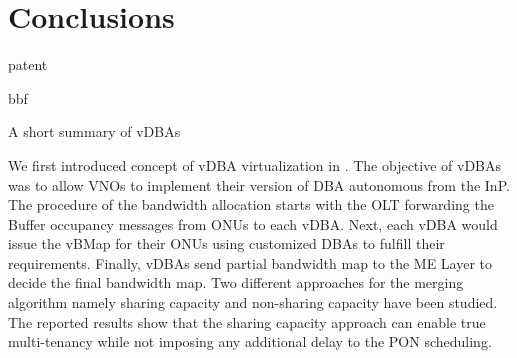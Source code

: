 \section{Conclusions}
patent

bbf

\begin{boxbox}[colback=white]{A short summary of \acp{vDBA}}

We first introduced  concept of \ac{vDBA} virtualization in \cite{Elrasad:17}. The objective of \acp{vDBA} was to allow \acp{VNO} to implement their version of \ac{DBA} autonomous from the \ac{InP}. The procedure of the bandwidth allocation starts with the \ac{OLT} forwarding the Buffer occupancy messages from \acp{ONU} to each \ac{vDBA}. Next, each \ac{vDBA} would issue the \ac{vBMap} for their \acp{ONU} using customized \acp{DBA} to fulfill their requirements. Finally, \acp{vDBA} send partial bandwidth map to the \ac{ME} Layer to decide the final bandwidth map. Two different approaches for the merging algorithm namely sharing capacity and non-sharing capacity have been studied. The reported results show that the sharing capacity approach can enable true multi-tenancy while not imposing any additional delay to the \ac{PON} scheduling.
\end{boxbox}

